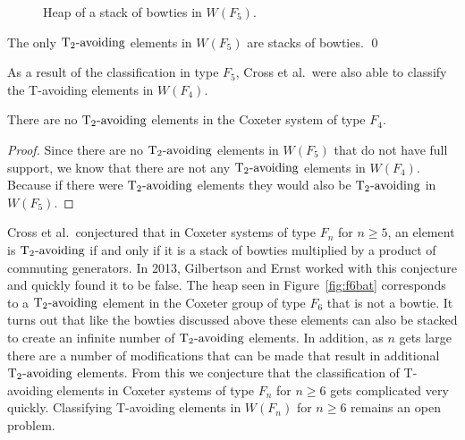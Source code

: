 \begin{figure*}[h!] \centering
{}
\caption{Heap of a stack of bowties in $W(F_5)$.}\label{fig:stackobowties}
\end{figure*}

\begin{proposition}
The only $\operatorname{T_2-\mathrm{avoiding}}$ elements in $W(F_5)$ are stacks of bowties. \qed	
\end{proposition}


As a result of the classification in type $F_5$, Cross et al.~were also able to classify the T-avoiding elements in $W(F_4)$. 

\begin{corollary}
There are no $\operatorname{T_2-\mathrm{avoiding}}$ elements in the Coxeter system of type $F_4$. 
\begin{proof}
	Since there are no $\operatorname{T_2-\mathrm{avoiding}}$ elements in $W(F_5)$ that do not have full support, we know that there are not any $\operatorname{T_2-\mathrm{avoiding}}$ elements in $W(F_4)$. Because if there were $\operatorname{T_2-\mathrm{avoiding}}$ elements they would also be $\operatorname{T_2-\mathrm{avoiding}}$ in $W(F_5)$.
\end{proof}
\end{corollary}

Cross et al.~conjectured that in Coxeter systems of type $F_n$ for $n \geq 5$, an element is $\operatorname{T_2-\mathrm{avoiding}}$ if and only if it is a stack of bowties multiplied by a product of commuting generators. In 2013, Gilbertson and Ernst worked with this conjecture and quickly found it to be false. The heap seen in Figure~\ref{fig:f6bat} corresponds to a $\operatorname{T_2-\mathrm{avoiding}}$ element in the Coxeter group of type $F_6$ that is not a bowtie. It turns out that like the bowties discussed above these elements can also be stacked to create an infinite number of $\operatorname{T_2-\mathrm{avoiding}}$ elements. In addition, as $n$ gets large there are a number of modifications that can be made that result in additional $\operatorname{T_2-\mathrm{avoiding}}$ elements. From this we conjecture that the classification of T-avoiding elements in Coxeter systems of type $F_n$ for $n \geq 6$ gets complicated very quickly. Classifying T-avoiding elements in $W(F_n)$ for $n \geq 6$ remains an open problem. 

